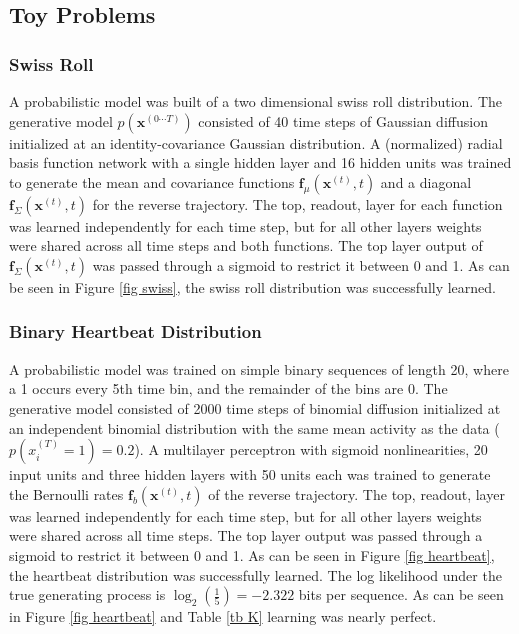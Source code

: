 \documentclass{article}
\newcommand{\mb}{\mathbf}
\newcommand{\qtraj}{p\left( \mb x^{(0\cdots T)} \right)}
\begin{document}
\subsection{Toy Problems}

\subsubsection{Swiss Roll}
\label{sec swiss}
A probabilistic model was built of a two dimensional swiss roll distribution. %
The generative model $\qtraj$ consisted of 40 time steps of Gaussian 
diffusion initialized at an identity-covariance Gaussian distribution.  
A (normalized) radial basis function network with a single hidden layer and 16 hidden units was trained to generate the mean and covariance 
functions $\mb f_\mu\left( \mb x^{(t)}, t \right)$ and a diagonal $\mb f_\Sigma\left( \mb x^{(t)}, t \right)$ for the reverse trajectory. 
The top, readout, layer for each function was 
learned independently for each time step, but for all other layers weights were shared across all time steps and both functions. 
The top layer output of $\mb f_\Sigma\left( \mb x^{(t)}, t \right)$ was passed through a sigmoid to restrict it between 0 and 1. 
As can be seen in Figure \ref{fig swiss}, the swiss roll distribution was successfully learned.

\subsubsection{Binary Heartbeat Distribution}
\label{sec heart}
A probabilistic model was trained on simple binary sequences of length 20, where a 1 occurs every 5th time bin, and the remainder of the bins are 0.  
The generative model consisted of 2000 time steps of binomial diffusion initialized at an independent binomial distribution with the 
same mean activity as the data ($p\left( x_i^{(T)} = 1 \right) = 0.2$). 
A multilayer perceptron with sigmoid nonlinearities, 20 input units 
and three hidden layers with 
50 units each was trained to generate the Bernoulli rates $\mb f_b\left( \mb x^{(t)}, t \right)$ of the reverse trajectory.  
The top, readout, layer was 
learned independently for each time step, but for all other layers weights were shared across all time steps. 
The top layer output was passed through a sigmoid to restrict it between 0 and 1. 
As can be seen in 
Figure \ref{fig heartbeat}, the heartbeat distribution was successfully learned.  The log likelihood under the true generating process is 
$\log_2\left( \frac{1}{5} \right) = -2.322$ bits per sequence.  As can be seen in Figure \ref{fig heartbeat} and Table \ref{tb K} learning was nearly perfect.
\end{document}
